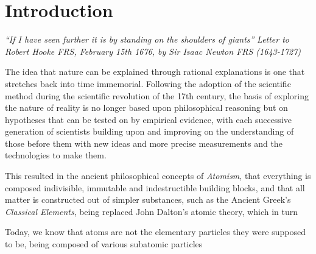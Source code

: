 \chapter{Introduction}\label{chapter:intro}

\emph{``If I have seen further it is by standing on the shoulders of giants''}
\emph{Letter to Robert Hooke FRS, February 15th 1676, by Sir Isaac Newton FRS (1643-1727)}

The idea that nature can be explained through rational explanations is one that stretches back into time immemorial.
Following the adoption of the scientific method during the scientific revolution of the 17th century, the basis of  exploring the nature of reality is no longer based upon philosophical reasoning but on hypotheses that can be tested on by empirical evidence, with each successive generation of scientists building upon and improving on the understanding of those before them with new ideas and more precise measurements and the technologies to make them.

This resulted in the ancient philosophical concepts of \emph{Atomism}, that everything is composed indivisible, immutable and indestructible building blocks, and that all matter is constructed out of simpler substances, such as the Ancient Greek's \emph{Classical Elements}, being replaced John Dalton's atomic theory, which  in turn 

Today, we know that atoms are not the elementary particles they were supposed to be, being composed of various subatomic particles
